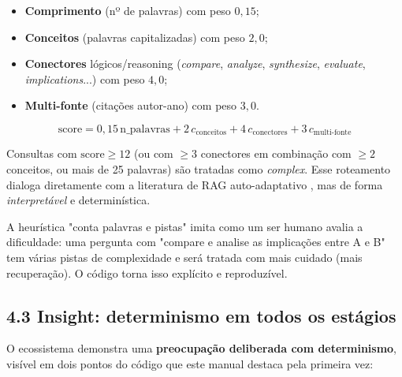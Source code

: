 \begin{itemize}
  \item \textbf{Comprimento} (nº de palavras) com peso $0{,}15$;
  \item \textbf{Conceitos} (palavras capitalizadas) com peso $2{,}0$;
  \item \textbf{Conectores} lógicos/reasoning (\emph{compare}, \emph{analyze},
        \emph{synthesize}, \emph{evaluate}, \emph{implications}...) com peso $4{,}0$;
  \item \textbf{Multi-fonte} (citações autor-ano) com peso $3{,}0$.
\end{itemize}

\begin{equation}
\label{eq:complexity}
\text{score} = 0{,}15\,\text{n\_palavras} + 2\,c_{\text{conceitos}}
+ 4\,c_{\text{conectores}} + 3\,c_{\text{multi-fonte}}
\end{equation}

\noindent Consultas com $\text{score} \geq 12$ (ou com $\geq 3$ conectores em
combinação com $\geq 2$ conceitos, ou mais de 25 palavras) são tratadas como
\emph{complex}. Esse roteamento dialoga diretamente com a literatura de RAG
auto-adaptativo \cite{Jeong2024AdaptiveRAG}, mas de forma \emph{interpretável} e
determinística.

\begin{intuicao}
A heurística "conta palavras e pistas" imita como um ser humano avalia a
dificuldade: uma pergunta com "compare e analise as implicações entre A e B"
tem várias pistas de complexidade e será tratada com mais cuidado (mais
recuperação). O código torna isso explícito e reproduzível.
\end{intuicao}

\subsection*{4.3 Insight: determinismo em todos os estágios}

 O ecossistema demonstra uma \textbf{preocupação deliberada com
determinismo}, visível em dois pontos do código que este manual destaca pela
primeira vez:

